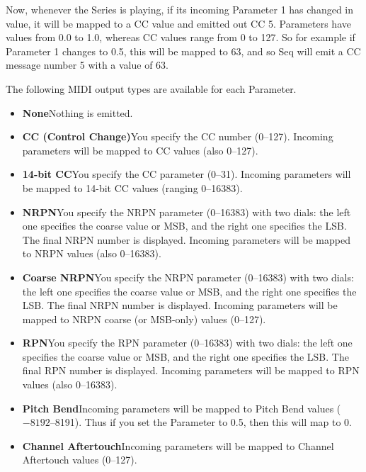 \documentclass[twoside,10pt]{article}
\begin{document}
Now, whenever the Series is playing, if its incoming Parameter 1 has changed in value, it will be mapped to a CC value and emitted out CC 5.  Parameters have values from 0.0 to 1.0, whereas CC values range from 0 to 127.  So for example if Parameter 1 changes to 0.5, this will be mapped to 63, and so Seq will emit a CC message number 5 with a value of 63.

The following MIDI output types are available for each Parameter.

\begin{itemize} 
\item {\bf None}\quad Nothing is emitted.
\item {\bf CC (Control Change)}\quad You specify the CC number (0--127).  Incoming parameters will be mapped to CC values (also 0--127).
\item {\bf 14-bit CC}\quad You specify the CC parameter (0--31).  Incoming parameters will be mapped to 14-bit CC values (ranging 0--16383).
\item {\bf NRPN}\quad You specify the NRPN parameter (0--16383) with two dials: the left one specifies the coarse value or MSB, and the right one specifies the LSB.  The final NRPN number is displayed.  Incoming parameters will be mapped to NRPN values (also 0--16383).
\item {\bf Coarse NRPN}\quad You specify the NRPN parameter (0--16383) with two dials: the left one specifies the coarse value or MSB, and the right one specifies the LSB.  The final NRPN number is displayed.  Incoming parameters will be mapped to NRPN coarse (or MSB-only) values (0--127).
\item {\bf RPN}\quad You specify the RPN parameter (0--16383) with two dials: the left one specifies the coarse value or MSB, and the right one specifies the LSB.  The final RPN number is displayed.  Incoming parameters will be mapped to RPN values (also 0--16383).
\item {\bf Pitch Bend}\quad Incoming parameters will be mapped to Pitch Bend values (\(-8192\)--8191).  Thus if you set the Parameter to 0.5, then this will map to 0.
\item {\bf Channel Aftertouch}\quad Incoming parameters will be mapped to Channel Aftertouch values (0--127).
\end{itemize}
\end{document}
